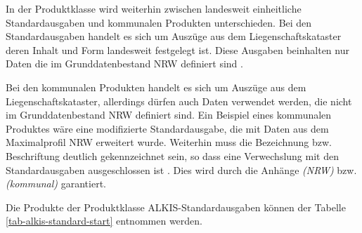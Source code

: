 In der Produktklasse wird weiterhin zwischen landesweit einheitliche Standardausgaben und kommunalen Produkten unterschieden. Bei den Standardausgaben handelt es sich um Auszüge aus dem Liegenschaftskataster deren Inhalt und Form landesweit festgelegt ist. Diese Ausgaben beinhalten nur Daten die im Grunddatenbestand NRW definiert sind \autocite[vgl.][8]{bezk-grunddaten}.

Bei den kommunalen Produkten handelt es sich um Auszüge aus dem Liegenschaftskataster, allerdings dürfen auch Daten verwendet werden, die nicht im Grunddatenbestand NRW definiert sind. Ein Beispiel eines kommunalen Produktes wäre eine modifizierte Standardausgabe, die mit Daten aus dem Maximalprofil NRW erweitert wurde. Weiterhin muss die Bezeichnung bzw. Beschriftung deutlich gekennzeichnet sein, so dass eine Verwechslung mit den Standardausgaben ausgeschlossen ist \autocite[vgl.][9]{bezk-grunddaten}. Dies wird durch die Anhänge \textit{(NRW)} bzw. \textit{(kommunal)} garantiert.

Die Produkte der Produktklasse ALKIS-Standardausgaben können der Tabelle \ref{tab-alkis-standard-start}  entnommen werden.

